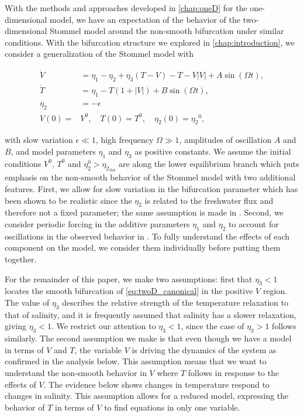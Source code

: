 With the methods and approaches developed in \autoref{chap:oneD} for the one-dimensional model, we have an expectation of the behavior of the two-dimensional Stommel model around the non-smooth bifurcation under similar conditions. With the bifurcation structure we explored in \autoref{chap:introduction}, we consider a generalization of the Stommel model with

\begin{equation}\label{eq:twoD_canonical}
  \begin{aligned}
   \dot{V} & =  \eta_1-\eta_2+\eta_3(T-V)-T-V|V|+A\sin(\Omega t), \\
   \dot{T}     & =  \eta_1-T(1+|V|)+B\sin(\Omega t),  \\
  \dot{\eta_2}  & =  -\epsilon\\
  V(0)=&V^0,\quad T(0)=T^0, \quad \eta_2(0)={\eta_2}^0,
  \end{aligned}
\end{equation}

with slow variation $\epsilon\ll 1$, high frequency $\Omega\gg 1$, amplitudes of oscillation $A$ and $B$, and model parameters $\eta_1$ and $\eta_3$ as positive constants. We assume the initial conditions $V^0$, $T^0$ and $\eta_2^0>{\eta_2}_{ns}$ are along the lower equilibrium branch which puts emphasis on the non-smooth behavior of the Stommel model with two additional features. First, we allow for slow variation in the bifurcation parameter which has been shown to be realistic since the $\eta_2$ is related to the freshwater flux and therefore not a fixed parameter; the same assumption is made in \cite{roberts2017relaxation}. Second, we consider periodic forcing in the additive parameters $\eta_1$ and $\eta_2$ to account for oscillations in the observed behavior in \cite{huybers2005obliquity}. To fully understand the effects of each component on the model, we consider them individually before putting them together.

For the remainder of this paper, we make two assumptions: first that $\eta_3<1$ locates the smooth bifurcation of \eqref{eq:twoD_canonical} in the positive $V$ region. The value of $\eta_3$ describes the relative strength of the temperature relaxation to that of salinity, and it is frequently assumed that salinity has a slower relaxation, giving $\eta_3<1$. We restrict our attention to $\eta_3<1$, since the case of $\eta_3>1$ follows similarly. The second assumption we make is that even though we have a model in terms of $V$ and $T$, the variable $V$ is driving the dynamics of the system as confirmed in the analysis below. This assumption means that we want to understand the non-smooth behavior in $V$ where $T$ follows in response to the effects of $V$. The evidence below shows changes in temperature respond to changes in salinity. This assumption allows for a reduced model, expressing the behavior of $T$ in terms of $V$ to find equations in only one variable.

